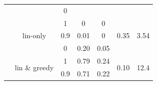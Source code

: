 \begin{table}[]
\begin{tabular}{ccccccc}
\multicolumn{1}{|c|}{}                         & \multicolumn{1}{c|}{}                               & \multicolumn{1}{c|}{0}                  & \multicolumn{1}{c|}{}                    & \multicolumn{1}{c|}{}                    & \multicolumn{1}{c|}{}                                                                    & \multicolumn{1}{c|}{}                                                                          \\ \cline{2-7} 
\multicolumn{1}{|c|}{}                         & \multicolumn{1}{c|}{\multirow{3}{*}{lin-only}}      & \multicolumn{1}{c|}{1}                  & \multicolumn{1}{c|}{0}                   & \multicolumn{1}{c|}{0}                   & \multicolumn{1}{c|}{\multirow{3}{*}{0.35}}                                               & \multicolumn{1}{c|}{\multirow{3}{*}{3.54}}                                                     \\ \cline{3-5}
\multicolumn{1}{|c|}{}                         & \multicolumn{1}{c|}{}                               & \multicolumn{1}{c|}{0.9}                & \multicolumn{1}{c|}{0.01}                & \multicolumn{1}{c|}{0}                   & \multicolumn{1}{c|}{}                                                                    & \multicolumn{1}{c|}{}                                                                          \\ \cline{3-5}
\multicolumn{1}{|c|}{}                         & \multicolumn{1}{c|}{}                               & \multicolumn{1}{c|}{0}                  & \multicolumn{1}{c|}{0.20}                & \multicolumn{1}{c|}{0.05}                & \multicolumn{1}{c|}{}                                                                    & \multicolumn{1}{c|}{}                                                                          \\ \cline{2-7} 
\multicolumn{1}{|c|}{}                         & \multicolumn{1}{c|}{\multirow{3}{*}{lin \& greedy}} & \multicolumn{1}{c|}{1}                  & \multicolumn{1}{c|}{0.79}                & \multicolumn{1}{c|}{0.24}                & \multicolumn{1}{c|}{\multirow{3}{*}{0.10}}                                               & \multicolumn{1}{c|}{\multirow{3}{*}{12.4}}                                                     \\ \cline{3-5}
\multicolumn{1}{|c|}{}                         & \multicolumn{1}{c|}{}                               & \multicolumn{1}{c|}{0.9}                & \multicolumn{1}{c|}{0.71}                & \multicolumn{1}{c|}{0.22}                & \multicolumn{1}{c|}{}                                                                    & \multicolumn{1}{c|}{}                                                                          \\ \cline{3-5}

\end{tabular}
\end{table}
